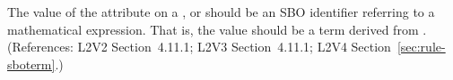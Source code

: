 The value of the  attribute on a \AlgebraicRule, \RateRule or
\AssignmentRule should be an SBO identifier referring to a mathematical
expression.  That is, the value should be a term derived from
\sbomathformula.  (References: L2V2 Section~4.11.1;
L2V3 Section~4.11.1; L2V4 Section~\ref{sec:rule-sboterm}.)
